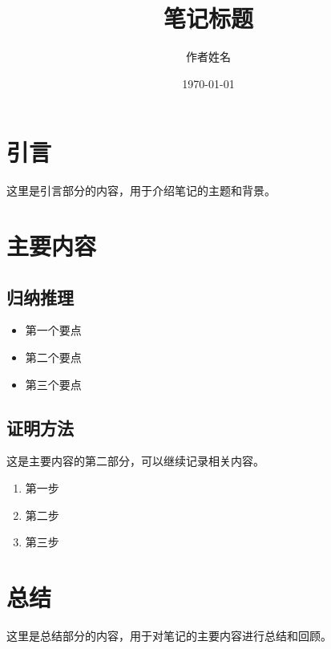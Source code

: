 \documentclass[12pt,a4paper]{article} %
\title{笔记标题} %
\author{作者姓名} %
\date{\today} %
\begin{document}
	
	\maketitle %
	
	\section{引言} %
	这里是引言部分的内容，用于介绍笔记的主题和背景。
	
	\section{主要内容} %
	\subsection{归纳推理} %
	
	
	\begin{itemize} %
		\item 第一个要点
		\item 第二个要点
		\item 第三个要点
	\end{itemize}
	
	\subsection{证明方法} %
	这是主要内容的第二部分，可以继续记录相关内容。
	
	\begin{enumerate} %
		\item 第一步
		\item 第二步
		\item 第三步
	\end{enumerate}
	
	\section{总结} %
	这里是总结部分的内容，用于对笔记的主要内容进行总结和回顾。
	
\end{document}
